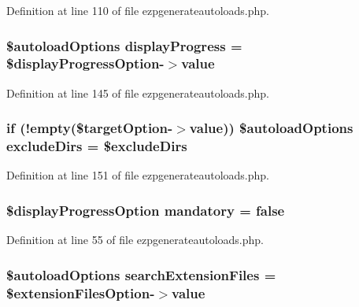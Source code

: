 Definition at line 110 of file ezpgenerateautoloads.\-php.

\hypertarget{ezpgenerateautoloads_8php_aa79f55582aba2bd3eff4d3fa4b980a84}{
\subsubsection[{display\-Progress}]{\setlength{\rightskip}{0pt plus 5cm}\$autoload\-Options {\bf display\-Progress} = \$display\-Progress\-Option-\/$>$value}}\label{ezpgenerateautoloads_8php_aa79f55582aba2bd3eff4d3fa4b980a84}


Definition at line 145 of file ezpgenerateautoloads.\-php.

\hypertarget{ezpgenerateautoloads_8php_a52217447e9aa7d329a16ea69370b42a4}{
\subsubsection[{exclude\-Dirs}]{\setlength{\rightskip}{0pt plus 5cm}if (!empty(\$target\-Option-\/$>$value)) \$autoload\-Options {\bf exclude\-Dirs} = \${\bf exclude\-Dirs}}}\label{ezpgenerateautoloads_8php_a52217447e9aa7d329a16ea69370b42a4}


Definition at line 151 of file ezpgenerateautoloads.\-php.

\hypertarget{ezpgenerateautoloads_8php_ac38115d855b4d48735ec865ab62bf1fe}{
\subsubsection[{mandatory}]{\setlength{\rightskip}{0pt plus 5cm}\$display\-Progress\-Option {\bf mandatory} = false}}\label{ezpgenerateautoloads_8php_ac38115d855b4d48735ec865ab62bf1fe}


Definition at line 55 of file ezpgenerateautoloads.\-php.

\hypertarget{ezpgenerateautoloads_8php_ae648f5335e57fa264ffaaf9d2fe4c61b}{
\subsubsection[{search\-Extension\-Files}]{\setlength{\rightskip}{0pt plus 5cm}\$autoload\-Options {\bf search\-Extension\-Files} = \$extension\-Files\-Option-\/$>$value}}\label{ezpgenerateautoloads_8php_ae648f5335e57fa264ffaaf9d2fe4c61b}


